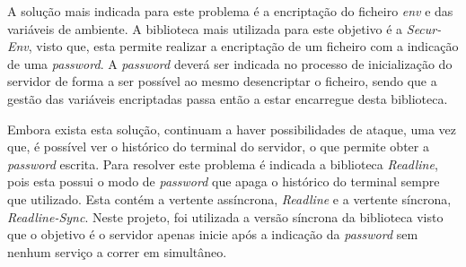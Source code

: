 A solução mais indicada para este problema é a encriptação do ficheiro \textit{env} e das variáveis de ambiente. A biblioteca mais utilizada para este objetivo é a \textit{Secur-Env}, visto que, esta permite realizar a encriptação de um ficheiro com a indicação de uma \textit{password}. A \textit{password} deverá ser indicada no processo de inicialização do servidor de forma a ser possível ao mesmo desencriptar o ficheiro, sendo que a gestão das variáveis encriptadas passa então a estar encarregue desta biblioteca.

Embora exista esta solução, continuam a haver possibilidades de ataque, uma vez que, é possível ver o histórico do terminal do servidor, o que permite obter a \textit{password} escrita. Para resolver este problema é indicada a biblioteca \textit{Readline}, pois esta possui o modo de \textit{password} que apaga o histórico do terminal sempre que utilizado. Esta contém a vertente assíncrona, \textit{Readline} e a vertente síncrona, \textit{Readline-Sync}. Neste projeto, foi utilizada a versão síncrona da biblioteca visto que o objetivo é o servidor apenas inicie após a indicação da \textit{password} sem nenhum serviço a correr em simultâneo.